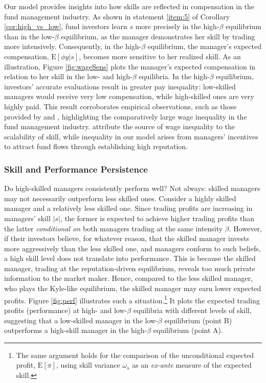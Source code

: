 Our model provides insights into how skills are reflected in compensation in the fund management industry. As shown in statement \ref{item:5} of Corollary \ref{cor:high_vs_low}, fund investors learn $s$ more precisely in the high-$\beta$ equilibrium than in the low-$\beta$ equilibrium, as the manager demonstrates her skill by trading more intensively. Consequently, in the high-$\beta$ equilibrium, the manager's expected compensation, $\mathrm{E}[\phi y|s]$, becomes more sensitive to her realized skill. As an illustration, Figure \ref{fig:wageSens} plots the manager's expected compensation in relation to her skill in the low- and high-$\beta$ equilibria. In the high-$\beta$ equilibrium, investors' accurate evaluations result in greater pay inequality: low-skilled managers would receive very low compensation, while high-skilled ones are very highly paid. This result corroborates empirical observations, such as those provided by \citet{philippon2012wages} and \citet*{bohm2018since}, highlighting the comparatively large wage inequality in the fund management industry. \citet{celerier2019returns} attribute the source of wage inequality to the scalability of skill, while inequality in our model arises from managers' incentives to attract fund flows through establishing high reputation.

\subsubsection{Skill and Performance Persistence}\label{sss:skill_persistence}

Do high-skilled managers consistently perform well? Not always: skilled managers may not necessarily outperform less skilled ones. Consider a highly skilled manager and a relatively less skilled one. Since trading profits are increasing in managers' skill $|s|$, the former is expected to achieve higher trading profits than the latter \emph{conditional on} both managers trading at the same intensity $\beta$. However, if their investors believe, for whatever reason, that the skilled manager invests more aggressively than the less skilled one, and managers conform to such beliefs, a high skill level does not translate into performance. This is because the skilled manager, trading at the reputation-driven equilibrium, reveals too much private information to the market maker. Hence, compared to the less skilled manager, who plays the Kyle-like equilibrium, the skilled manager may earn lower expected profits. Figure \ref{fig:perf}  illustrates such a situation.\footnote{The same argument holds for the comparison of the unconditional expected profit, $\mathrm{E}[\pi]$, using skill variance $\omega_{s}$ as an \textit{ex-ante} measure of the expected skill.}
 It plots the expected trading profits (performance) at high- and low-$\beta$ equilibria with different levels of skill, suggesting that a low-skilled manager in the low-$\beta$ equilibrium (point B) outperforms a high-skill manager in the high-$\beta$ equilibrium (point A).

